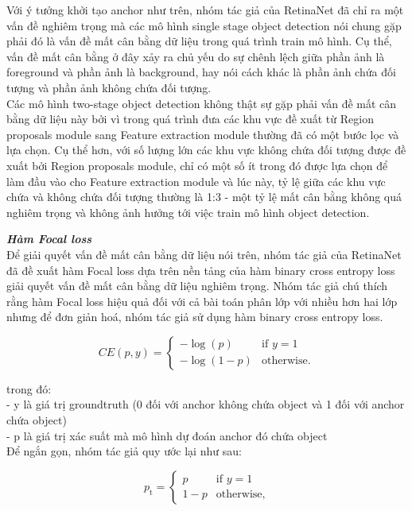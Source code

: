 {    \noindent
    Với ý tưởng khởi tạo anchor như trên, nhóm tác giả của RetinaNet đã chỉ ra một vấn đề nghiêm trọng mà các mô hình single stage object detection nói chung gặp phải đó là vấn đề mất cân bằng dữ liệu trong quá trình train mô hình.
    Cụ thể, vấn đề mất cân bằng ở đây xảy ra chủ yếu do sự chênh lệch giữa phần ảnh là foreground và phần ảnh là background, hay nói cách khác là phần ảnh chứa đối tượng và phần ảnh không chứa đối tượng. \\
    Các mô hình two-stage object detection không thật sự gặp phải vấn đề mất cân bằng dữ liệu này bởi vì trong quá trình đưa các khu vực đề xuất từ Region proposals module sang Feature extraction module thường đã có một bước lọc và lựa chọn.
    Cụ thể hơn, với số lượng lớn các khu vực không chứa đối tượng được đề xuất bởi Region proposals module, chỉ có một số ít trong đó được lựa chọn để làm đầu vào cho Feature extraction module và lúc này, tỷ lệ giữa các khu vực chứa và không chứa đối tượng thường là 1:3 - một tỷ lệ mất cân bằng không quá nghiêm trọng và không ảnh hưởng tới việc train mô hình object detection.

    \noindent
    \textbf{\textit{Hàm Focal loss}} \\
    Để giải quyết vấn đề mất cân bằng dữ liệu nói trên, nhóm tác giả của RetinaNet đã đề xuất hàm Focal loss dựa trên nền tảng của hàm binary cross entropy loss giải quyết vấn đề mất cân bằng dữ liệu nghiêm trọng.
    Nhóm tác giả chú thích rằng hàm Focal loss hiệu quả đối với cả bài toán phân lớp với nhiều hơn hai lớp nhưng để đơn giản hoá, nhóm tác giả sử dụng hàm binary cross entropy loss.

    \begin{equation}
        \label{eq:bce}
        CE(p,y) = 
        \begin{cases}
            -\log(p) &\text{if $y = 1$} \\
            -\log (1 - p) &\text{otherwise.}
        \end{cases}
    \end{equation}

    \noindent
    trong đó: \\
    - y là giá trị groundtruth (0 đối với anchor không chứa object và 1 đối với anchor chứa object) \\
    - p là giá trị xác suất mà mô hình dự đoán anchor đó chứa object \\
    Để ngắn gọn, nhóm tác giả quy ước lại như sau:

    \begin{equation}
        \label{eq:bce}
        p_\textrm{t} =
        \begin{cases}
            p &\text{if $y = 1$} \\
            1 - p &\text{otherwise,}
        \end{cases}
    \end{equation}

}
